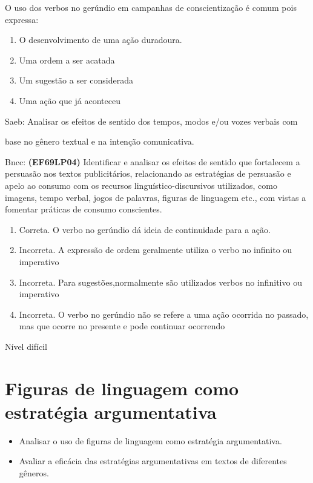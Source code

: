 O uso dos verbos no gerúndio em campanhas de conscientização é comum
pois expressa:

\begin{enumerate}
\def\labelenumi{\alph{enumi})}
\item
  O desenvolvimento de uma ação duradoura.
\item
  Uma ordem a ser acatada
\item
  Um sugestão a ser considerada
\item
  Uma ação que já aconteceu
\end{enumerate}

Saeb: Analisar os efeitos de sentido dos tempos, modos e/ou vozes
verbais com

base no gênero textual e na intenção comunicativa.

Bncc: \textbf{(EF69LP04)} Identificar e analisar os efeitos de sentido
que fortalecem a persuasão nos textos publicitários, relacionando as
estratégias de persuasão e apelo ao consumo com os recursos
linguístico-discursivos utilizados, como imagens, tempo verbal, jogos de
palavras, figuras de linguagem etc., com vistas a fomentar práticas de
consumo conscientes.

\begin{enumerate}
\def\labelenumi{\arabic{enumi}.}
\item
  Correta. O verbo no gerúndio dá ideia de continuidade para a ação.
\item
  Incorreta. A expressão de ordem geralmente utiliza o verbo no infinito
  ou imperativo
\item
  Incorreta. Para sugestões,normalmente são utilizados verbos no
  infinitivo ou imperativo
\item
  Incorreta. O verbo no gerúndio não se refere a uma ação ocorrida no
  passado, mas que ocorre no presente e pode continuar ocorrendo
\end{enumerate}

Nível difícil


\chapter{Figuras de linguagem como estratégia argumentativa}


\begin{itemize}
  
  \item Analisar o uso de figuras de linguagem como estratégia argumentativa.

  \item Avaliar a eficácia das estratégias argumentativas em textos de diferentes gêneros.

\end{itemize}

